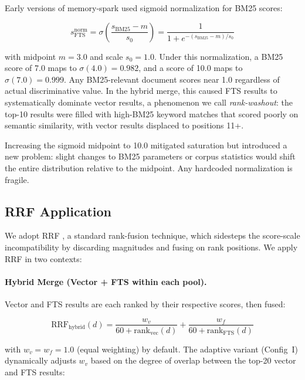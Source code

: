 \documentclass[11pt]{article}
\begin{document}
Early versions of memory-spark used sigmoid normalization for BM25 scores:

\begin{equation}
  s_{\text{FTS}}^{\text{norm}} = \sigma\!\left(\frac{s_{\text{BM25}} - m}{s_0}\right)
  = \frac{1}{1 + e^{-(s_{\text{BM25}} - m)/s_0}}
\end{equation}

with midpoint $m = 3.0$ and scale $s_0 = 1.0$. Under this normalization, a BM25 score
of 7.0 maps to $\sigma(4.0) = 0.982$, and a score of 10.0 maps to $\sigma(7.0) = 0.999$.
Any BM25-relevant document scores near 1.0 regardless of actual discriminative value.
In the hybrid merge, this caused FTS results to systematically dominate vector results,
a phenomenon we call \emph{rank-washout}: the top-10 results were filled with
high-BM25 keyword matches that scored poorly on semantic similarity, with vector
results displaced to positions 11+.

Increasing the sigmoid midpoint to 10.0 mitigated saturation but introduced a new
problem: slight changes to BM25 parameters or corpus statistics would shift the entire
distribution relative to the midpoint. Any hardcoded normalization is fragile.

\subsection{RRF Application}

We adopt RRF \citep{cormack2009reciprocal}, a standard rank-fusion technique, which sidesteps
the score-scale incompatibility by discarding magnitudes and fusing on rank positions.
We apply RRF in two contexts:

\paragraph{Hybrid Merge (Vector + FTS within each pool).}
Vector and FTS results are each ranked by their respective scores, then fused:

\begin{equation}
  \text{RRF}_{\text{hybrid}}(d) = \frac{w_v}{60 + \text{rank}_{\text{vec}}(d)}
    + \frac{w_f}{60 + \text{rank}_{\text{FTS}}(d)}
\end{equation}

with $w_v = w_f = 1.0$ (equal weighting) by default. The adaptive variant (Config~I)
dynamically adjusts $w_v$ based on the degree of overlap between the top-20 vector and
FTS results:
\end{document}
